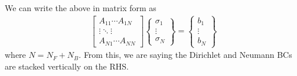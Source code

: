 \documentclass[10pt]{article}
\newcommand{\pp}[2]{\frac{\partial #1}{\partial #2}}
\newcommand{\mbf}[1]{\mathbf{#1}}
\newcommand{\be}{\begin{eqnarray}}
\newcommand{\ee}{\end{eqnarray}}
\newcommand{\tn}[1]{\textrm{#1}}
\begin{document}

We can write the above in matrix form as
\be
\label{eqn:AIC}
\begin{bmatrix}
    A_{11} \cdots A_{1N} \\
    \vdots \ddots \vdots \\
    A_{N1} \cdots A_{NN}
\end{bmatrix}
\left\{
\begin{matrix}
    \sigma_1 \\
    \vdots   \\
    \sigma_N
\end{matrix}
\right\}
=
\left\{
\begin{matrix}
    b_1    \\
    \vdots \\
    b_N
\end{matrix}
\right\}
\ee
where $N=N_F + N_B$.
From this, we are saying the Dirichlet and Neumann BCs are stacked vertically on the RHS.

\end{document}

